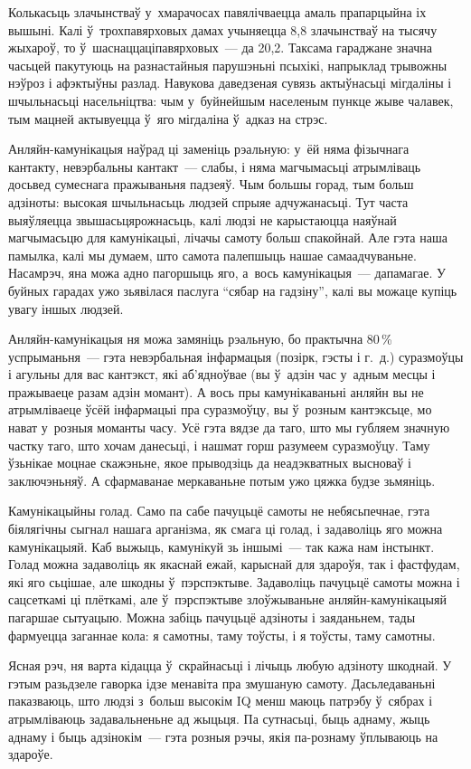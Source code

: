 Колькасьць злачынстваў у~хмарачосах павялічваецца амаль прапарцыйна іх вышыні. Калі ў~трохпавярховых дамах учыняецца 8,8 злачынстваў на тысячу жыхароў, то ў~шаснаццаціпавярховых~--- да 20,2. Таксама гараджане значна часьцей пакутуюць на разнастайныя парушэньні псыхікі, напрыклад трывожны нэўроз і афэктыўны разлад. Навукова даведзеная сувязь актыўнасьці мігдаліны і шчыльнасьці насельніцтва: чым у~буйнейшым населеным пункце жыве чалавек, тым мацней актывуецца ў~яго мігдаліна ў~адказ на стрэс.

Анляйн-камунікацыя наўрад ці заменіць рэальную: у~ёй няма фізычнага кантакту, невэрбальны кантакт~--- слабы, і няма магчымасьці атрымліваць досьвед сумеснага пражываньня падзеяў. Чым большы горад, тым больш адзіноты: высокая шчыльнасьць людзей спрыяе адчужанасьці. Тут часта выяўляецца звышасьцярожнасьць, калі людзі не карыстаюцца наяўнай магчымасьцю для камунікацыі, лічачы самоту больш спакойнай. Але гэта наша памылка, калі мы думаем, што самота палепшыць нашае самаадчуваньне. Насамрэч, яна можа адно пагоршыць яго, а~вось камунікацыя~--- дапамагае. У буйных гарадах ужо зьявілася паслуга ``сябар на гадзіну'', калі вы можаце купіць увагу іншых людзей.

Анляйн-камунікацыя ня можа замяніць рэальную, бо практычна 80\,\% успрыманьня~--- гэта невэрбальная інфармацыя (позірк, гэсты і г.~д.) суразмоўцы і агульны для вас кантэкст, які аб'ядноўвае (вы ў~адзін час у~адным месцы і пражываеце разам адзін момант). А вось пры камунікаваньні анляйн вы не атрымліваеце ўсёй інфармацыі пра суразмоўцу, вы ў~розным кантэксьце, мо нават у~розныя моманты часу. Усё гэта вядзе да таго, што мы губляем значную частку таго, што хочам данесьці, і нашмат горш разумеем суразмоўцу. Таму ўзьнікае моцнае скажэньне, якое прыводзіць да неадэкватных высноваў і заключэньняў. А сфармаванае меркаваньне потым ужо цяжка будзе зьмяніць.

Камунікацыйны голад. Само па сабе пачуцьцё самоты не небясьпечнае, гэта біялягічны сыгнал нашага арганізма, як смага ці голад, і задаволіць яго можна камунікацыяй. Каб выжыць, камунікуй зь іншымі~--- так кажа нам інстынкт. Голад можна задаволіць як якаснай ежай, карыснай для здароўя, так і фастфудам, які яго сьцішае, але шкодны ў~пэрспэктыве. Задаволіць пачуцьцё самоты можна і сацсеткамі ці плёткамі, але ў~пэрспэктыве злоўжываньне анляйн-камунікацыяй пагаршае сытуацыю. Можна забіць пачуцьцё адзіноты і заяданьнем, тады фармуецца заганнае кола: я самотны, таму тоўсты, і я тоўсты, таму самотны.

Ясная рэч, ня варта кідацца ў~скрайнасьці і лічыць любую адзіноту шкоднай. У гэтым разьдзеле гаворка ідзе менавіта пра змушаную самоту. Дасьледаваньні паказваюць, што людзі з~больш высокім IQ менш маюць патрэбу ў~сябрах і атрымліваюць задавальненьне ад жыцьця. Па сутнасьці, быць аднаму, жыць аднаму і быць адзінокім~--- гэта розныя рэчы, якія па-рознаму ўплываюць на здароўе.

